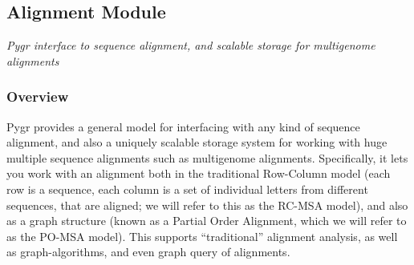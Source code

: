 \documentclass{howto}
\begin{document}
\subsection{Alignment Module}
\label{seqdb}

{\em Pygr interface to sequence alignment, and scalable storage for multigenome alignments}


\subsubsection{Overview}

Pygr provides a general model for interfacing with any kind of sequence alignment,
and also a uniquely scalable storage system for working with huge multiple sequence
alignments such as multigenome alignments.  Specifically, it lets you work with
an alignment both in the traditional Row-Column model (each row is a sequence, each
column is a set of individual letters from different sequences, that are aligned;
we will refer to this as the RC-MSA model), and also
as a graph structure (known as a Partial Order Alignment, which we will refer to as
the PO-MSA model).  This supports ``traditional'' alignment analysis, as well
as graph-algorithms, and even graph query of alignments.
\end{document}
